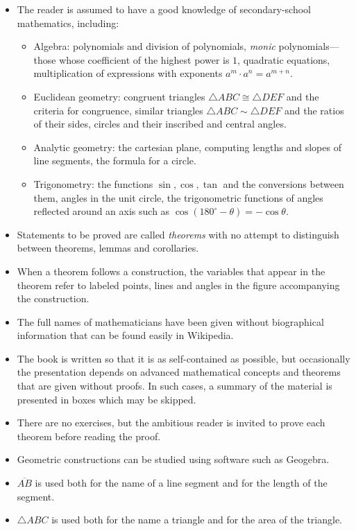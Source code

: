 \begin{itemize}
\item The reader is assumed to have a good knowledge of secondary-school mathematics, including:
\begin{itemize}
\item Algebra: polynomials and division of polynomials, \emph{monic} polynomials---those whose coefficient of the highest power is $1$, quadratic equations, multiplication of expressions with exponents $a^m\cdot a^n=a^{m+n}$.
\item Euclidean geometry: congruent triangles $\triangle ABC \cong \triangle DEF$ and the criteria for congruence, similar triangles $\triangle ABC \sim \triangle DEF$ and the ratios of their sides, circles and their inscribed and central angles.
\item Analytic geometry: the cartesian plane, computing lengths and slopes of line segments, the formula for a circle.
\item Trigonometry: the functions $\sin,\cos,\tan$ and the conversions between them, angles in the unit circle, the trigonometric functions of angles reflected around an axis such as $\cos (180^\circ-\theta)=-\cos\theta$.
\end{itemize}
\item Statements to be proved are called \emph{theorems} with no attempt to distinguish between theorems, lemmas and corollaries.
\item When a theorem follows a construction, the variables that appear in the theorem refer to labeled points, lines and angles in the figure accompanying the construction.
\item The full names of mathematicians have been given without biographical information that can be found easily in Wikipedia.
\item The book is written so that it is as self-contained as possible, but occasionally the presentation depends on advanced mathematical concepts and theorems that are given without proofs. In such cases, a summary of the material is presented in boxes which may be skipped.
\item There are no exercises, but the ambitious reader is invited to prove each theorem before reading the proof.
\item Geometric constructions can be studied using software such as Geogebra.
\item $\overline{AB}$ is used both for the name of a line segment and for the length of the segment.
\item $\triangle ABC$ is used both for the name a triangle and for the area of the triangle.
\end{itemize}


